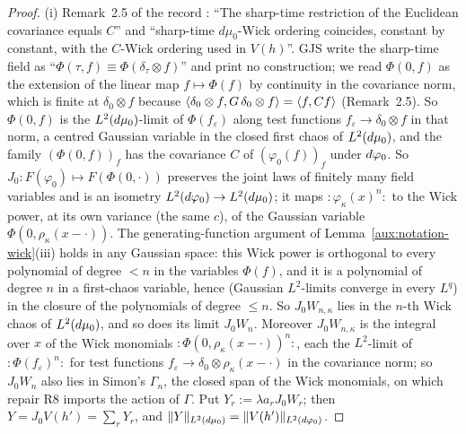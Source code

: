 \begin{proof}
(i) Remark~2.5 of the record \cite[p.~14]{R}: ``The sharp-time restriction of the Euclidean
covariance equals $C$'' and ``sharp-time $d\mu_0$-Wick ordering coincides, constant by constant,
with the $C$-Wick ordering used in $V(h)$''.  GJS write the sharp-time field as
``$\Phi(\tau,f)\equiv\Phi(\delta_\tau\otimes f)$'' \cite[p.~589]{GJS} and print no construction;
we read $\Phi(0,f)$ as the extension of the linear map $f\mapsto\Phi(f)$ by continuity in the
covariance norm, which is finite at $\delta_0\otimes f$ because
$\langle \delta_0\otimes f,G\,\delta_0\otimes f\rangle=\langle f,Cf\rangle$ (Remark~2.5).  So $\Phi(0,f)$ is the
$L^2(d\mu_0)$-limit of $\Phi(f_\varepsilon)$ along test functions $f_\varepsilon\to\delta_0\otimes
f$ in that norm, a centred Gaussian variable in the closed first chaos of $L^2(d\mu_0)$, and the
family $(\Phi(0,f))_f$ has the covariance $C$ of $(\varphi_0(f))_f$ under $d\varphi_0$.  So $J_0:F(\varphi_0)\mapsto F(\Phi(0,\cdot))$
preserves the joint laws of finitely many field variables and is an isometry
$L^2(d\varphi_0)\to L^2(d\mu_0)$; it maps ${:}\varphi_\kappa(x)^n{:}$ to the Wick power, at its own
variance (the same $c$), of the Gaussian variable $\Phi(0,\rho_\kappa(x-\cdot))$.  The
generating-function argument of Lemma~\ref{aux:notation-wick}(iii) holds in any Gaussian space:
this Wick power is orthogonal to every polynomial of degree $<n$ in the variables $\Phi(f)$, and
it is a polynomial of degree $n$ in a first-chaos variable, hence (Gaussian $L^2$-limits converge
in every $L^q$) in the closure of the polynomials of degree $\le n$.  So $J_0W_{n,\kappa}$ lies in
the $n$-th Wick chaos of $L^2(d\mu_0)$, and so does its limit $J_0W_n$.  Moreover $J_0W_{n,\kappa}$
is the integral over $x$ of the Wick monomials ${:}\Phi(0,\rho_\kappa(x-\cdot))^n{:}$, each the
$L^2$-limit of ${:}\Phi(f_\varepsilon)^n{:}$ for test functions $f_\varepsilon\to\delta_0\otimes
\rho_\kappa(x-\cdot)$ in the covariance norm; so $J_0W_n$ also lies in Simon's $\Gamma_n$, the
closed span of the Wick monomials, on which repair R8 imports the action of $\Gamma$.  Put
$Y_r:=\lambda a_rJ_0W_r$; then $Y=J_0V(h')=\sum_rY_r$, and $\|Y\|_{L^2(d\mu_0)}=\|V(h')\|_{L^2(d\varphi_0)}$.


\end{proof}
